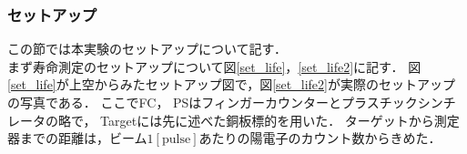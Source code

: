 \subsubsection{セットアップ}
この節では本実験のセットアップについて記す．\\
まず寿命測定のセットアップについて図\ref{set_life}，\ref{set_life2}に記す．
図\ref{set_life}が上空からみたセットアップ図で，図\ref{set_life2}が実際のセットアップの写真である．
ここでFC， PSはフィンガーカウンターとプラスチックシンチレータの略で， Targetには先に述べた銅板標的を用いた．
ターゲットから測定器までの距離は，ビーム$1[\mathrm{pulse}]$あたりの陽電子のカウント数からきめた．
